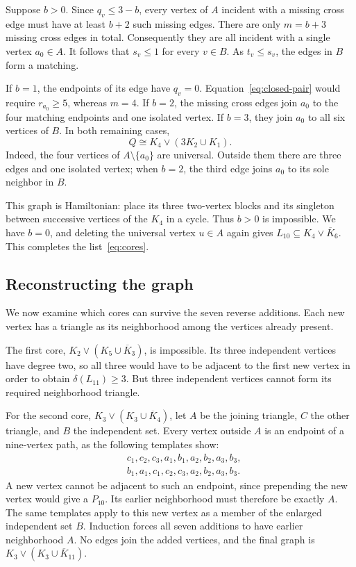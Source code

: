 \documentclass[12pt]{article}
\newcommand{\Ic}{\overline K}
\begin{document}
Suppose $b>0$. Since $q_v\leq3-b$, every vertex of $A$
incident with a missing cross edge must have at least
$b+2$ such missing edges. There are only $m=b+3$ missing
cross edges in total. Consequently they are all incident
with a single vertex $a_0\in A$.
It follows that $s_v\leq1$ for every $v\in B$.
As $t_v\leq s_v$, the edges in $B$ form a matching.

If $b=1$, the endpoints of its edge have $q_v=0$.
Equation~\eqref{eq:closed-pair} would require $r_{a_0}\geq5$,
whereas $m=4$. If $b=2$, the missing cross edges join $a_0$
to the four matching endpoints and one isolated vertex.
If $b=3$, they join $a_0$ to all six vertices of $B$.
In both remaining cases,
\[
 Q\cong K_4\vee(3K_2\cup K_1).
\]
Indeed, the four vertices of $A\setminus\{a_0\}$ are universal.
Outside them there are three edges and one isolated vertex;
when $b=2$, the third edge joins $a_0$ to its sole neighbor
in $B$.

This graph is Hamiltonian: place its three two-vertex blocks
and its singleton between successive vertices of the $K_4$
in a cycle. Thus $b>0$ is impossible. We have $b=0$,
and deleting the universal vertex $u\in A$ again gives
$L_{10}\subseteq K_4\vee\Ic_6$.
This completes the list~\eqref{eq:cores}.

\subsection{Reconstructing the graph}

We now examine which cores can survive the seven reverse
additions. Each new vertex has a triangle as its neighborhood
among the vertices already present.

The first core, $K_2\vee(K_5\cup\Ic_3)$, is impossible.
Its three independent vertices have degree two, so all three
would have to be adjacent to the first new vertex in order
to obtain $\delta(L_{11})\geq3$. But three independent
vertices cannot form its required neighborhood triangle.

For the second core, $K_3\vee(K_3\cup\Ic_4)$, let $A$
be the joining triangle, $C$ the other triangle, and $B$
the independent set. Every vertex outside $A$ is an endpoint
of a nine-vertex path, as the following templates show:
\[
 \begin{split}
 &c_1,c_2,c_3,a_1,b_1,a_2,b_2,a_3,b_3,\\
 &b_1,a_1,c_1,c_2,c_3,a_2,b_2,a_3,b_3.
 \end{split}
\]
A new vertex cannot be adjacent to such an endpoint, since
prepending the new vertex would give a $P_{10}$.
Its earlier neighborhood must therefore be exactly $A$.
The same templates apply to this new vertex as a member of
the enlarged independent set $B$. Induction forces all
seven additions to have earlier neighborhood $A$.
No edges join the added vertices, and the final graph is
$K_3\vee(K_3\cup\Ic_{11})$.
\end{document}
